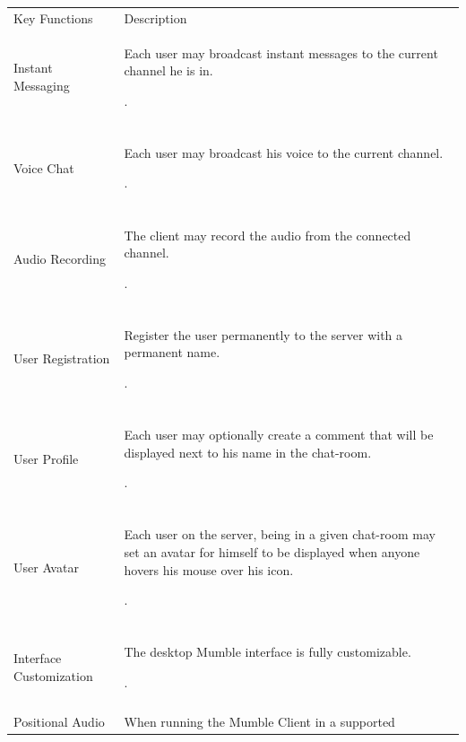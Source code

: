 \documentclass[twoside, titlepage]{article}
\begin{document}
	\begin{tabular}[t]{ll}\toprule
		\rowcolor{yellow-green}
		Key Functions & Description \\
		\rowcolor{gray}
		Instant Messaging & \begin{minipage}{0.5\textwidth}
			Each user may broadcast instant messages to the
			current channel he is in.
		\end{minipage}. \\\\
		Voice Chat & \begin{minipage}{0.5\textwidth}
			Each user may broadcast his voice to the current
			channel.
		\end{minipage}. \\\\
		\rowcolor{gray}
		Audio Recording & \begin{minipage}{0.5\textwidth}
			The client may record the audio from the connected
			channel.
		\end{minipage}. \\\\
		User Registration & \begin{minipage}{0.5\textwidth}
			Register the user permanently to the server with
			a permanent name.
		\end{minipage}. \\\\
		\rowcolor{gray}
		User Profile & \begin{minipage}{0.5\textwidth}
			Each user may optionally create a comment
			that will be displayed next to his name in the 
			chat-room.
		\end{minipage}. \\\\
		User Avatar & \begin{minipage}{0.5\textwidth}
			Each user on the server, being in a given
			chat-room may set an avatar for himself to be
			displayed when anyone hovers his mouse over his
			icon.
		\end{minipage}. \\\\
		\rowcolor{gray}
		Interface Customization & \begin{minipage}{0.5\textwidth}
			The desktop Mumble interface is fully customizable.
		\end{minipage}. \\\\
		Positional Audio & \begin{minipage}{0.5\textwidth}
			When running the Mumble Client in a supported

\end{minipage}
\end{tabular}
\end{document}
